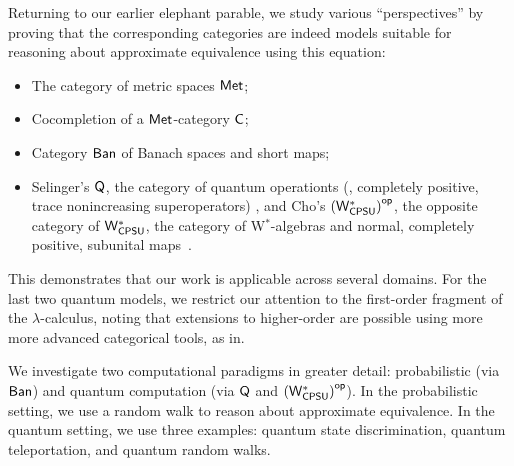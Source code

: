 Returning to our earlier elephant parable, we study various “perspectives” by proving that the corresponding categories are indeed models suitable for reasoning about approximate equivalence using this equation:
\begin{itemize}
    \item The category of metric spaces $\mathsf{Met}$;
    \item Cocompletion of a $\mathsf{Met}$-category $\mathsf{C}$;
    \item Category $ \mathsf{Ban} $ of Banach spaces and short maps;
    \item  Selinger’s \( \mathsf{Q} \), the category of quantum operationts (\ie, completely positive, trace nonincreasing superoperators) \cite{selinger2004towards}, and Cho’s \( \left(\mathsf{W^*_{CPSU}}\right)^{\mathsf{op}} \), the opposite category of \( \mathsf{W^*_{CPSU}} \), the category of W$^*$-algebras and normal, completely positive, subunital maps~\cite{choSemanticsQuantumProgramming2016}.
\end{itemize}
This demonstrates that our work is applicable across several domains. For the last two quantum models, we restrict our attention to the first-order fragment of the $\lambda$-calculus, noting that extensions to higher-order are possible using more  more advanced categorical tools, as  in\cite{dahlqvist2023syntactic}.

We investigate two computational paradigms in greater detail: probabilistic (via $\mathsf{Ban}$) and quantum computation (via $\mathsf{Q}$ and $\left(\mathsf{W^*_{CPSU}}\right)^{\mathsf{op}}$). In the probabilistic setting, we use a random walk to reason about approximate equivalence. In the quantum setting, we use three examples: quantum state discrimination, quantum teleportation, and quantum random walks.
 



